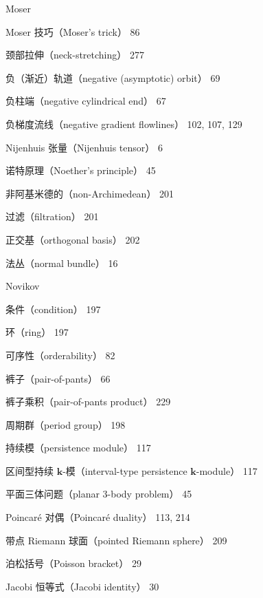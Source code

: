 {\noindent Moser\par
\noindent\hspace*{1.5em}Moser 技巧（Moser's trick） 86\par
\noindent 颈部拉伸（neck-stretching） 277\par
\noindent 负（渐近）轨道（negative (asymptotic) orbit） 69\par
\noindent 负柱端（negative cylindrical end） 67\par
\noindent 负梯度流线（negative gradient flowlines） 102, 107, 129\par
\noindent Nijenhuis 张量（Nijenhuis tensor） 6\par
\noindent 诺特原理（Noether's principle） 45\par
\noindent 非阿基米德的（non-Archimedean） 201\par
\noindent\hspace*{1.5em}过滤（filtration） 201\par
\noindent\hspace*{1.5em}正交基（orthogonal basis） 202\par
\noindent 法丛（normal bundle） 16\par
\noindent Novikov\par
\noindent\hspace*{1.5em}条件（condition） 197\par
\noindent\hspace*{1.5em}环（ring） 197\par
\noindent 可序性（orderability） 82\par
\noindent 裤子（pair-of-pants） 66\par
\noindent 裤子乘积（pair-of-pants product） 229\par
\noindent 周期群（period group） 198\par
\noindent 持续模（persistence module） 117\par
\noindent\hspace*{1.5em}区间型持续 $\mathbf{k}$-模（interval-type persistence $\mathbf{k}$-module） 117\par
\noindent 平面三体问题（planar 3-body problem） 45\par
\noindent Poincaré 对偶（Poincaré duality） 113, 214\par
\noindent 带点 Riemann 球面（pointed Riemann sphere） 209\par
\noindent 泊松括号（Poisson bracket） 29\par
\noindent\hspace*{1.5em}Jacobi 恒等式（Jacobi identity） 30\par
}
